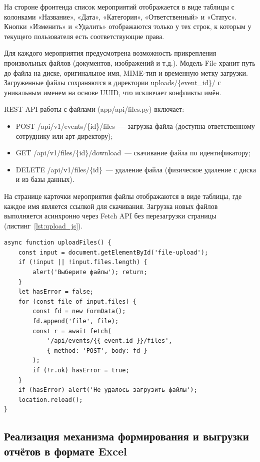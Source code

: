 На стороне фронтенда список мероприятий отображается в виде таблицы
с колонками «Название», «Дата», «Категория», «Ответственный» и
«Статус». Кнопки «Изменить» и «Удалить» отображаются только у тех
строк, к которым у текущего пользователя есть соответствующие права.


Для каждого мероприятия предусмотрена возможность прикрепления
произвольных файлов (документов, изображений и т.д.). Модель
File хранит путь до файла на диске, оригинальное имя,
MIME-тип и временную метку загрузки. Загруженные файлы сохраняются
в директории uploads/\{event\_id\}/ с уникальным именем
на основе UUID, что исключает конфликты имён.

REST API работы с файлами (app/api/files.py) включает:
\begin{itemize}
    \item POST /api/v1/events/\{id\}/files~--- загрузка файла
          (доступна ответственному сотруднику или арт-директору);
    \item GET /api/v1/files/\{id\}/download~--- скачивание
          файла по идентификатору;
    \item DELETE /api/v1/files/\{id\}~--- удаление файла
          (физическое удаление с диска и из базы данных).
\end{itemize}

На странице карточки мероприятия файлы отображаются в виде таблицы,
где каждое имя является ссылкой для скачивания. Загрузка новых файлов
выполняется асинхронно через Fetch API без перезагрузки
страницы (листинг~\ref{lst:upload_js}).

\begin{lstlisting}[caption={JavaScript-функция загрузки файлов}, label={lst:upload_js}]
async function uploadFiles() {
    const input = document.getElementById('file-upload');
    if (!input || !input.files.length) {
        alert('Выберите файлы'); return;
    }
    let hasError = false;
    for (const file of input.files) {
        const fd = new FormData();
        fd.append('file', file);
        const r = await fetch(
            '/api/events/{{ event.id }}/files',
            { method: 'POST', body: fd }
        );
        if (!r.ok) hasError = true;
    }
    if (hasError) alert('Не удалось загрузить файлы');
    location.reload();
}
\end{lstlisting}
\newpage
\subsection{Реализация механизма формирования и выгрузки отчётов в формате Excel}

